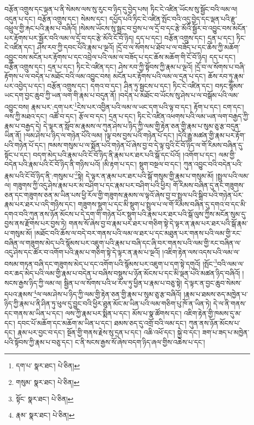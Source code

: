 བརྩོན་འགྲུས་དང་ལྡན་པ་ནི་སེམས་ལས་སུ་རུང་བ་ཉིད་དུ་བྱེད་པས། ཏིང་ངེ་འཛིན་ཡོངས་སུ་སྦྱོང་བའི་ལམ་ལ། འདུན་པ་དང་། བརྩོན་འགྲུས་དང་། སེམས་དང་། དཔྱོད་པའི་ཏིང་ངེ་འཛིན་སྤོང་བའི་འདུ་བྱེད་དང་ལྡན་པའི་རྫུ་འཕྲུལ་གྱི་རྐང་པའི་རྣམ་པ་བཞིའོ། །སེམས་ཡོངས་སུ་སྦྱང་བ་བྱས་པ་ལ་དྲོ་བ་དང་རྩེ་མོའི་སྦྱོར་བ་འབྱུང་བས་མངོན་པར་རྟོགས་པར་སྦྱོར་བའི་ལམ་ལ་དྲོ་བ་དང་རྩེ་མོའི་ངོ་བོ་ཉིད། དད་པ་དང་། བརྩོན་འགྲུས་དང་། དྲན་པ་དང་། ཏིང་ངེ་འཛིན་དང་། ཤེས་རབ་ཀྱི་དབང་པོའི་རྣམ་པ་ལྔའོ། །དྲོ་བ་ལ་སོགས་པ་ཐོབ་པ་ལ་བཟོད་པ་དང་ཆོས་ཀྱི་མཆོག་འབྱུང་བས་མངོན་པར་རྟོགས་པ་དང་འབྲེལ་པའི་ལམ་ལ་བཟོད་པ་དང་ཆོས་མཆོག་གི་ངོ་བོ་ཉིད། དད་པ་དང་། བརྩོན་འགྲུས་དང་། དྲན་པ་དང་། ཏིང་ངེ་འཛིན་དང་། ཤེས་རབ་ཀྱི་སྟོབས་ཀྱི་རྣམ་པ་ལྔའོ། །དྲོ་བ་ལ་སོགས་པ་བཞི་རྟོགས་པ་ལ་བདེན་པ་མཐོང་བའི་ལམ་འབྱུང་བས། མངོན་པར་རྟོགས་པའི་ལམ་ལ་དྲན་པ་དང་། ཆོས་རབ་ཏུ་རྣམ་པར་འབྱེད་པ་དང་། བརྩོན་འགྲུས་དང་། དགའ་བ་དང་། ཤིན་ཏུ་སྦྱངས་པ་དང་། ཏིང་ངེ་འཛིན་དང་། བཏང་སྙོམས་ཡང་དག་བྱང་ཆུབ་ཀྱི་ཡན་ལག་གི་རྣམ་པ་བདུན་ནོ། །བདེན་པ་མཐོང་བ་ཡོངས་སུ་ཤེས་པ་ལ་བསྒོམ་པའི་ལམ་འབྱུང་བས། རྣམ་པར་:དག་པར་\footnote{དག་པ་  སྣར་ཐང་།  པེ་ཅིན། }ངེས་པར་འབྱིན་པའི་ལམ་ལ་ཡང་དག་པའི་ལྟ་བ་དང་། རྟོག་པ་དང་། ངག་དང་། ལས་ཀྱི་མཐའ་དང་། འཚོ་བ་དང་། རྩོལ་བ་དང་། དྲན་པ་དང་། ཏིང་ངེ་འཛིན་འཕགས་པའི་ལམ་ཡན་ལག་བརྒྱད་ཀྱི་རྣམ་པ་བརྒྱད་དེ། དེ་ལྟར་ན་སློབ་མ་རྣམས་ལ་ཀུན་ཤེས་པ་ཉིད་ཀྱི་ལམ་གྱི་རྟེན་ཅན་གྱི་རྣམ་པ་སུམ་ཅུ་རྩ་བདུན་ཡིན་ནོ། །ལམ་ཤེས་པ་ཉིད་ལ་གཉེན་པོའི་ལམ། །ལྟ་བས་བྱས་པའི་གཉེན་པོ་དང་། །དེའི་རྒྱུ་མཚན་གྱི་རྣམ་པར་རྟོག་པའི་གཉེན་པོ་དང་། ཁམས་གསུམ་པ་ལ་སྨོན་པའི་གཉེན་པོ་ཞེས་བྱ་བ་དེ་ལྟ་བུའི་ངོ་བོ་ཉིད་ལ་གོ་རིམས་བཞིན་དུ་སྟོང་པ་དང་། བདག་མེད་པའི་རྣམ་པའི་ངོ་བོ་ཉིད་ནི་རྣམ་པར་ཐར་པའི་སྒོ་དང་པོའོ། །འགོག་པ་དང་། ལམ་གྱི་བདེན་པའི་རྣམ་པའི་ངོ་བོ་ཉིད་ནི་གཉིས་པའོ། །མི་རྟག་པ་དང་། སྡུག་བསྔལ་བ་དང་། ཀུན་འབྱུང་བའི་བདེན་པའི་རྣམ་པའི་ངོ་བོ་ཉིད་ནི་:གསུམ་པ་\footnote{གསུམ་  སྣར་ཐང་།  པེ་ཅིན། }སྟེ། དེ་ལྟར་ན་རྣམ་པར་ཐར་པའི་སྒོ་གསུམ་གྱི་རྣམ་པ་གསུམ་མོ། །སྤྲུལ་པའི་ལམ་ལ། གཟུགས་ཀྱི་འདུ་ཤེས་རྣམ་པར་མ་བཤིག་པ་དང་རྣམ་པར་བཤིག་པའི་ཕྱིར། གོ་རིམས་བཞིན་དུ་ནང་གཟུགས་ཅན་དང་གཟུགས་ཅན་མ་ཡིན་པས་ཕྱི་རོལ་གྱི་གཟུགས་རྣམས་ལ་ལྟའོ་ཞེས་བྱ་བ་སྤྲུལ་པའི་སྒྲིབ་པའི་གཉེན་པོར་རྣམ་པར་ཐར་པ་འདི་གཉིས་དང་། གཟུགས་སྡུག་པ་དང་མི་སྡུག་པ་སྤྲུལ་པ་ལ་གོ་རིམས་བཞིན་དུ་དགའ་བ་དང་མི་དགའ་བའི་ཀུན་ནས་ཉོན་མོངས་པ་དེ་དག་གི་གཉེན་པོར་སྡུག་པའི་རྣམ་པར་ཐར་པའི་སྒོ་ལུས་ཀྱིས་མངོན་སུམ་དུ་བྱས་ནས་རྫོགས་པར་བྱས་ཏེ། གནས་སོ་ཞེས་བྱ་བ་རྣམ་པར་ཐར་པ་གཅིག་སྟེ་དེ་ལྟར་ན་རྣམ་པར་ཐར་པའི་སྒོ་རྣམ་པ་གསུམ་མོ། །མཐོང་བའི་ཆོས་ལ་བདེ་བར་གནས་པའི་ལམ་ལ་ཐར་པ་དང་མཐུན་པར་གནས་པའི་ལམ་གྱི་རང་བཞིན་ལ་གཟུགས་མེད་པའི་སྙོམས་པར་འཇུག་པའི་རྣམ་པ་བཞི་དང་ཞི་བར་གནས་པའི་ལམ་གྱི་རང་བཞིན་ལ་འདུ་ཤེས་དང་ཚོར་བ་འགོག་པའི་རྣམ་པ་གཅིག་སྟེ་དེ་ལྟར་ན་རྣམ་པ་ལྔའོ། །འཇིག་རྟེན་ལས་འདས་པའི་ལམ་ལ་བསམ་གཏན་བཞི་དང་གཟུགས་མེད་པ་དང་འགོག་པའི་སྙོམས་པར་འཇུག་པ་དག་སྟེ་དགུའོ། །སྤོང་\footnote{སྟོང་  སྣར་ཐང་།  པེ་ཅིན། }བའི་ལམ་ལ་བར་ཆད་མེད་པའི་ལམ་གྱི་རྣམ་པ་བདེན་པ་བཞིས་བསྡུས་པ་ཉོན་མོངས་པ་དང་མི་ལྡན་པའི་མཚན་ཉིད་བཞིའོ། །སངས་རྒྱས་ཉིད་ཀྱི་ལམ་ལ། སྦྱིན་པ་ལ་སོགས་པའི་ཕ་རོལ་ཏུ་ཕྱིན་པ་རྣམ་པ་བཅུ་སྟེ། དེ་ལྟར་ན་བྱང་ཆུབ་སེམས་དཔའ་རྣམས་\footnote{རྣམ་  སྣར་ཐང་།  པེ་ཅིན། }ལ་ལམ་ཤེས་པ་ཉིད་ཀྱི་ལམ་གྱི་རྟེན་ཅན་གྱི་རྣམ་པ་སུམ་ཅུ་རྩ་བཞིའོ། །རྣམ་པ་ཐམས་ཅད་མཁྱེན་པ་ཉིད་ཀྱི་རྣམ་པ་ནི་ཤིན་ཏུ་ཕུལ་དུ་བྱུང་བའི་ཕྱིར་ཐུན་མོང་མ་ཡིན་པའི་ལམ་གཅིག་པུ་ཁོ་ན་ཡིན་ཏེ། དེ་ལ་ནི་གནས་དང་གནས་མ་ཡིན་པ་དང་། ལས་ཀྱི་རྣམ་པར་སྨིན་པ་དང་། མོས་པ་སྣ་ཚོགས་དང་། འཇིག་རྟེན་གྱི་ཁམས་དུ་མ་དང་། དབང་པོ་མཆོག་དང་མཆོག་མ་ཡིན་པ་དང་། ཐམས་ཅད་དུ་འགྲོ་བའི་ལམ་དང་། ཀུན་ནས་ཉོན་མོངས་པ་དང་། རྣམ་པར་བྱང་བ་དང་། སྔོན་གྱི་གནས་རྗེས་སུ་དྲན་པ་དང་། འཆི་འཕོ་དང་། སྐྱེ་བ་དང་། ཟག་པ་ཟད་པ་མཁྱེན་པའི་སྟོབས་ཀྱི་རྣམ་པ་བཅུ་དང་། ང་ནི་སངས་རྒྱས་སོ་ཞེས་བདག་ཉིད་ཞལ་གྱིས་འཆེས་པ་དང་། 